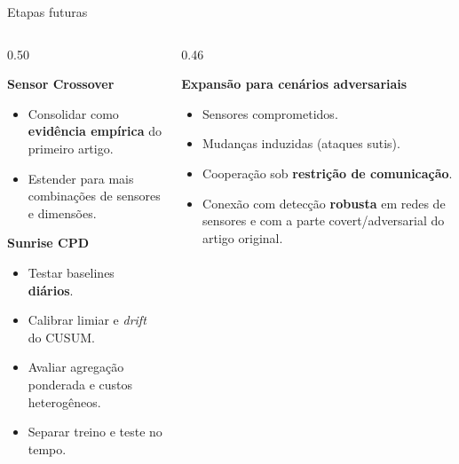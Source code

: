 \documentclass[aspectratio=169, 11pt]{beamer}
\begin{document}
\begin{frame}{Etapas futuras}

\begin{columns}[T]
\begin{column}{0.50\textwidth}

\textbf{Sensor Crossover}
\begin{itemize}
  \item Consolidar como \textbf{evidência empírica} do primeiro artigo.
  \item Estender para mais combinações de sensores e dimensões.
\end{itemize}

\vspace{0.4em}
\textbf{Sunrise CPD}
\begin{itemize}
  \item Testar baselines \textbf{diários}.
  \item Calibrar limiar e \textit{drift} do CUSUM.
  \item Avaliar agregação ponderada e custos heterogêneos.
  \item Separar treino e teste no tempo.
\end{itemize}

\end{column}
\begin{column}{0.46\textwidth}

\textbf{Expansão para cenários adversariais}
\begin{itemize}
  \item Sensores comprometidos.
  \item Mudanças induzidas (ataques sutis).
  \item Cooperação sob \textbf{restrição de comunicação}.
  \item Conexão com detecção \textbf{robusta} em redes de sensores
        e com a parte covert/adversarial do artigo original.
\end{itemize}

\end{column}
\end{columns}

\end{frame}
\end{document}
